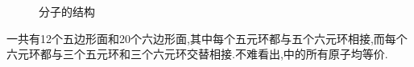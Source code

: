 \documentclass{ctexart}
\begin{document}
\begin{figure}[H]
{\begin{minipage}[b]{.3\linewidth}
        \end{minipage}
    }
    \vspace{-10pt}\caption{分子的结构}
\end{figure}
一共有12个五边形面和20个六边形面,其中每个五元环都与五个六元环相接,而每个六元环都与三个五元环和三个六元环交替相接.不难看出,中的所有原子均等价.
\end{document}
